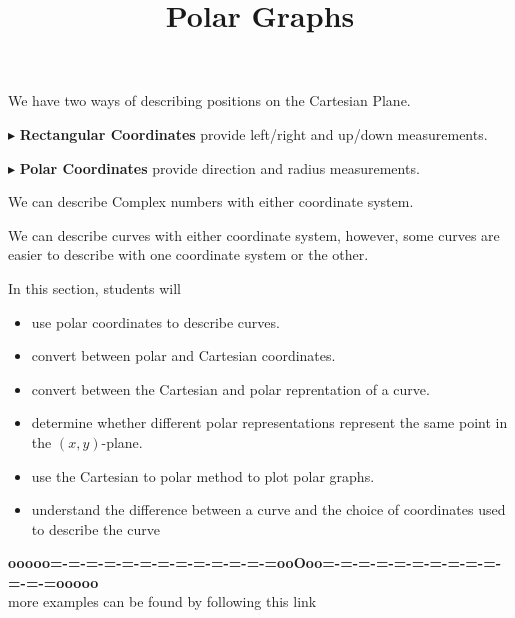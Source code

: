 \documentclass{ximera}
\title{Polar Graphs}
\begin{document}
\begin{abstract}
\end{abstract}
\maketitle





We have two ways of describing positions on the Cartesian Plane.


$\blacktriangleright$ \textbf{Rectangular Coordinates} provide left/right and up/down measurements.





$\blacktriangleright$ \textbf{Polar Coordinates} provide direction and radius measurements.




We can describe Complex numbers with either coordinate system.


We can describe curves with either coordinate system, however, some curves are easier to describe with one coordinate system or the other.




\begin{sectionOutcomes}
In this section, students will 

\begin{itemize}
\item use polar coordinates to describe curves.
\item convert between polar and Cartesian coordinates.
\item convert between the Cartesian and polar reprentation of a curve.
\item determine whether different polar representations represent the same point in the $(x,y)$-plane.
\item use the Cartesian to polar method to plot polar graphs.
\item understand the difference between a curve and the choice of coordinates used to describe the curve
\end{itemize}
\end{sectionOutcomes}











\begin{center}
\textbf{\textcolor{green!50!black}{ooooo=-=-=-=-=-=-=-=-=-=-=-=-=ooOoo=-=-=-=-=-=-=-=-=-=-=-=-=ooooo}} \\

more examples can be found by following this link\\ 

\end{center}
\end{document}

